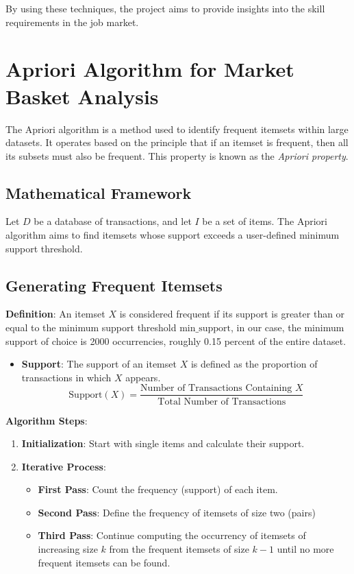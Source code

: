 \documentclass{article}
\begin{document}
By using these techniques, the project aims to provide insights into the  skill requirements in the job market.


\section{Apriori Algorithm for Market Basket Analysis}

The Apriori algorithm is a method used to identify frequent itemsets within large datasets.
It operates based on the principle that if an itemset is frequent, then all its subsets must also be frequent. This property is known as the \textit{Apriori property}.

\subsection{Mathematical Framework}

Let \( D \) be a database of transactions, and let \( I \) be a set of items. The Apriori algorithm aims to find itemsets whose support exceeds a user-defined minimum support threshold.

\subsection{Generating Frequent Itemsets}

\textbf{Definition}: An itemset \( X \) is considered frequent if its support is greater than or equal to the minimum support threshold \( \text{min\_support} \), in our case, the minimum support of choice is 2000 occurrencies, roughly 0.15 percent of the entire dataset.

\begin{itemize}
    \item \textbf{Support}: The support of an itemset \( X \) is defined as the proportion of transactions in which \( X \) appears.
    \[
    \text{Support}(X) = \frac{\text{Number of Transactions Containing } X}{\text{Total Number of Transactions}}
    \]
\end{itemize}

\textbf{Algorithm Steps}:
\begin{enumerate}
    \item \textbf{Initialization}: Start with single items and calculate their support.
    \item \textbf{Iterative Process}:
    \begin{itemize}
        \item \textbf{First Pass}: Count the frequency (support) of each item.
        \item \textbf{Second Pass}: Define the frequency of itemsets of size two (pairs)
        \item \textbf{Third Pass}: Continue computing the occurrency of itemsets of increasing size \( k \) from the frequent itemsets of size \( k-1 \) until no more frequent itemsets can be found.
    \end{itemize}
\end{enumerate}
\end{document}
